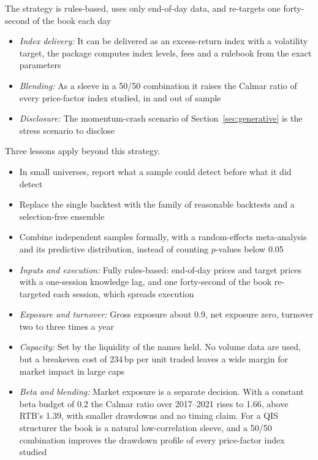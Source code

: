  The strategy is rules-based, uses only end-of-day data, and re-targets one forty-second of the book each day
\begin{itemize}
  \item \emph{Index delivery:} It can be delivered as an excess-return index with a volatility target, the package computes index levels, fees and a rulebook from the exact parameters
  \item \emph{Blending:} As a sleeve in a 50/50 combination it raises the Calmar ratio of every price-factor index studied, in and out of sample
  \item \emph{Disclosure:} The momentum-crash scenario of Section~\ref{sec:generative} is the stress scenario to disclose
\end{itemize}

 Three lessons apply beyond this strategy.
\begin{itemize}
  \item In small universes, report what a sample could detect before what it did detect
  \item Replace the single backtest with the family of reasonable backtests and a selection-free ensemble
  \item Combine independent samples formally, with a random-effects meta-analysis and its predictive distribution, instead of counting $p$-values below 0.05
\end{itemize}

\begin{itemize}
  \item \emph{Inputs and execution:} Fully rules-based: end-of-day prices and target prices with a one-session knowledge lag, and one forty-second of the book re-targeted each session, which spreads execution
  \item \emph{Exposure and turnover:} Gross exposure about 0.9, net exposure zero, turnover two to three times a year
  \item \emph{Capacity:} Set by the liquidity of the names held. No volume data are used, but a breakeven cost of 234\,bp per unit traded leaves a wide margin for market impact in large caps
  \item \emph{Beta and blending:} Market exposure is a separate decision. With a constant beta budget of 0.2 the Calmar ratio over 2017--2021 rises to 1.66, above RTB's 1.39, with smaller drawdowns and no timing claim. For a QIS structurer the book is a natural low-correlation sleeve, and a 50/50 combination improves the drawdown profile of every price-factor index studied
\end{itemize}

